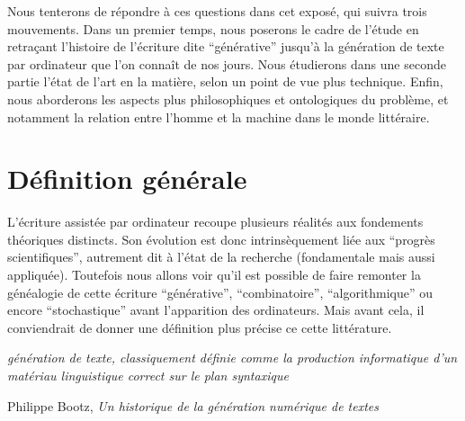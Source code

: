 \documentclass{article}
\newenvironment{citationbox}
{\begin{center}
		\begin{minipage}{.8\textwidth}
		}
		{
		\end{minipage}	
\end{center}
}
\begin{document}
		Nous tenterons de répondre à ces questions dans cet exposé, qui suivra trois mouvements. Dans un premier temps, nous poserons le cadre de l'étude en retraçant l'histoire de l'écriture dite ``générative'' jusqu'à la génération de texte par ordinateur que l'on connaît de nos jours. Nous étudierons dans une seconde partie l'état de l'art en la matière, selon un point de vue plus technique. Enfin, nous aborderons les aspects plus philosophiques et ontologiques du problème, et notamment la relation entre l'homme et la machine dans le monde littéraire.
		
		\section*{Définition générale}
			L'écriture assistée par ordinateur recoupe plusieurs réalités aux fondements théoriques distincts. Son évolution est donc intrinsèquement liée aux ``progrès scientifiques'', autrement dit à l'état de la recherche (fondamentale mais aussi appliquée). Toutefois nous allons voir qu'il est possible de faire remonter la généalogie de cette écriture ``générative'', ``combinatoire'', ``algorithmique'' ou encore ``stochastique'' avant l'apparition des ordinateurs. Mais avant cela, il conviendrait de donner une définition plus précise ce cette littérature.
			\begin{citationbox}
				\textit{génération de texte, classiquement définie comme la production informatique d'un matériau linguistique correct sur le plan syntaxique}
				\begin{flushright}
					Philippe Bootz, \textit{Un historique de la génération numérique de textes} \cite{bootz}
				\end{flushright}
			\end{citationbox}
				
\end{document}
